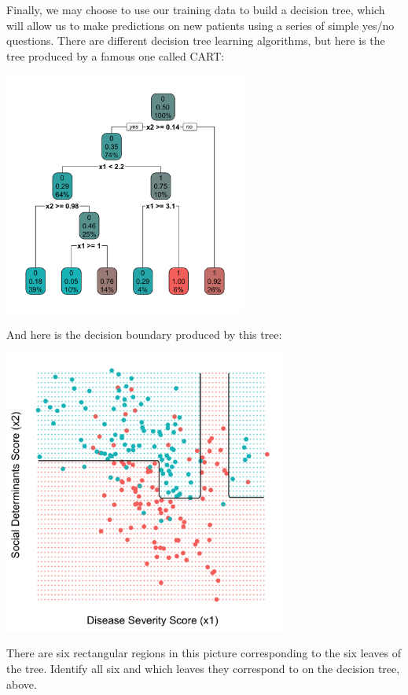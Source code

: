Finally, we may choose to use our training data to build a decision tree, which will allow us to make predictions on new patients using a series of simple yes/no questions. There are different decision tree learning algorithms, but here is the tree produced by a famous one called CART:
\begin{center}
\includegraphics[width=0.6\textwidth]{img/esl-decision-tree-just-tree.png}
\end{center}
And here is the decision boundary produced by this tree:
\begin{center}
\includegraphics[width=0.7\textwidth]{img/esl-decision-tree.png}
\end{center}

\begin{question}{}
There are six rectangular regions in this picture corresponding to the six leaves of the tree. Identify all six and which leaves they correspond to on the decision tree, above.
\end{question}

